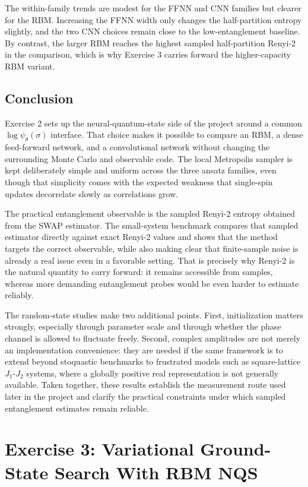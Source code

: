 \documentclass[11pt,a4paper]{article}
\begin{document}
The within-family trends are modest for the FFNN and CNN families but clearer for the RBM. Increasing the FFNN width only changes the half-partition entropy slightly, and the two CNN choices remain close to the low-entanglement baseline. By contrast, the larger RBM reaches the highest sampled half-partition Renyi-2 in the comparison, which is why Exercise 3 carries forward the higher-capacity RBM variant.

\subsection*{Conclusion}

Exercise 2 sets up the neural-quantum-state side of the project around a common $\log \psi_\theta(\sigma)$ interface. That choice makes it possible to compare an RBM, a dense feed-forward network, and a convolutional network without changing the surrounding Monte Carlo and observable code. The local Metropolis sampler is kept deliberately simple and uniform across the three ansatz families, even though that simplicity comes with the expected weakness that single-spin updates decorrelate slowly as correlations grow.

The practical entanglement observable is the sampled Renyi-2 entropy obtained from the SWAP estimator. The small-system benchmark compares that sampled estimator directly against exact Renyi-2 values and shows that the method targets the correct observable, while also making clear that finite-sample noise is already a real issue even in a favorable setting. That is precisely why Renyi-2 is the natural quantity to carry forward: it remains accessible from samples, whereas more demanding entanglement probes would be even harder to estimate reliably.

The random-state studies make two additional points. First, initialization matters strongly, especially through parameter scale and through whether the phase channel is allowed to fluctuate freely. Second, complex amplitudes are not merely an implementation convenience: they are needed if the same framework is to extend beyond stoquastic benchmarks to frustrated models such as square-lattice $J_1$-$J_2$ systems, where a globally positive real representation is not generally available. Taken together, these results establish the measurement route used later in the project and clarify the practical constraints under which sampled entanglement estimates remain reliable.

\section*{Exercise 3: Variational Ground-State Search With RBM NQS}
\end{document}
